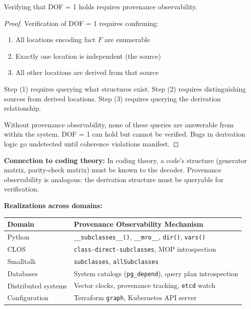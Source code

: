 \begin{theorem}[Provenance Observability is Necessary for Verifiable DOF = 1]\label{thm:provenance-necessary}
Verifying that DOF = 1 holds requires provenance observability.
\end{theorem}

\begin{proof}
Verification of DOF = 1 requires confirming:
\begin{enumerate}
\tightlist
\item All locations encoding fact $F$ are enumerable
\item Exactly one location is independent (the source)
\item All other locations are derived from that source
\end{enumerate}

Step (1) requires querying what structures exist. Step (2) requires distinguishing sources from derived locations. Step (3) requires querying the derivation relationship.

Without provenance observability, none of these queries are answerable from within the system. DOF = 1 can hold but cannot be verified. Bugs in derivation logic go undetected until coherence violations manifest.
\end{proof}

\textbf{Connection to coding theory:} In coding theory, a code's structure (generator matrix, parity-check matrix) must be known to the decoder. Provenance observability is analogous: the derivation structure must be queryable for verification.

\textbf{Realizations across domains:}

\begin{center}
\begin{tabularx}{\linewidth}{lX}
\toprule
\textbf{Domain} & \textbf{Provenance Observability Mechanism} \\
\midrule
Python & \texttt{\_\_subclasses\_\_()}, \texttt{\_\_mro\_\_}, \texttt{dir()}, \texttt{vars()} \\
CLOS & \texttt{class-direct-subclasses}, MOP introspection \\
Smalltalk & \texttt{subclasses}, \texttt{allSubclasses} \\
Databases & System catalogs (\texttt{pg\_depend}), query plan introspection \\
Distributed systems & Vector clocks, provenance tracking, \texttt{etcd} watch \\
Configuration & Terraform \texttt{graph}, Kubernetes API server \\
\bottomrule
\end{tabularx}
\end{center}


